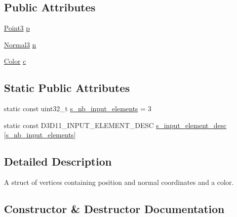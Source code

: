 \subsection*{Public Attributes}
\begin{DoxyCompactItemize}
\item 
\hyperlink{structmage_1_1_point3}{Point3} \hyperlink{structmage_1_1_vertex_position_normal_color_a6847c367ca68fb8d8e349c8441ae63dd}{p}
\item 
\hyperlink{structmage_1_1_normal3}{Normal3} \hyperlink{structmage_1_1_vertex_position_normal_color_a771c7e71e8b6441b73f513f511507650}{n}
\item 
\hyperlink{structmage_1_1_color}{Color} \hyperlink{structmage_1_1_vertex_position_normal_color_a0d170b26a78b179330ae282ce97a036b}{c}
\end{DoxyCompactItemize}
\subsection*{Static Public Attributes}
\begin{DoxyCompactItemize}
\item 
static const uint32\+\_\+t \hyperlink{structmage_1_1_vertex_position_normal_color_ad0030350b1fea5b8383c8e904ca45d51}{s\+\_\+nb\+\_\+input\+\_\+elements} = 3
\item 
static const D3\+D11\+\_\+\+I\+N\+P\+U\+T\+\_\+\+E\+L\+E\+M\+E\+N\+T\+\_\+\+D\+E\+SC \hyperlink{structmage_1_1_vertex_position_normal_color_a1d14ae159608683093a33b38fb6259e4}{s\+\_\+input\+\_\+element\+\_\+desc} \mbox{[}\hyperlink{structmage_1_1_vertex_position_normal_color_ad0030350b1fea5b8383c8e904ca45d51}{s\+\_\+nb\+\_\+input\+\_\+elements}\mbox{]}
\end{DoxyCompactItemize}


\subsection{Detailed Description}
A struct of vertices containing position and normal coordinates and a color. 

\subsection{Constructor \& Destructor Documentation}
\hypertarget{structmage_1_1_vertex_position_normal_color_a8c8eff8f2fc3520bec482e89e2b32119}{}\label{structmage_1_1_vertex_position_normal_color_a8c8eff8f2fc3520bec482e89e2b32119} 
